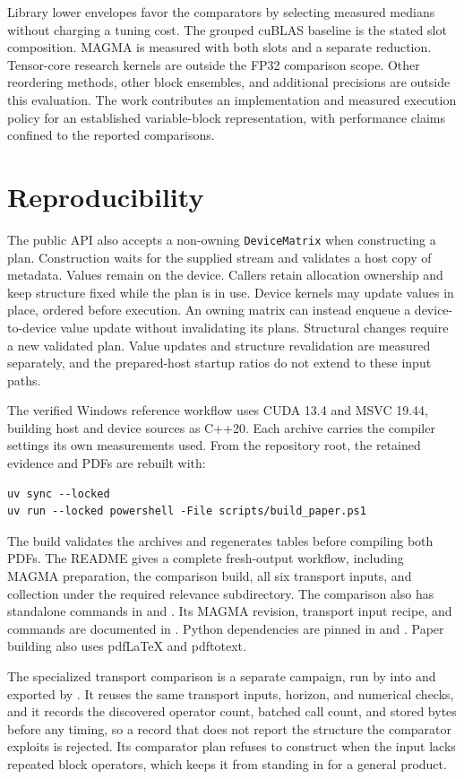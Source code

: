 \documentclass[10pt]{article}
\begin{document}
Library lower envelopes favor the comparators by selecting measured medians
without charging a tuning cost. The grouped cuBLAS baseline is the stated slot
composition. MAGMA is measured with both slots and a separate reduction.
Tensor-core research kernels are outside the FP32 comparison scope. Other reordering methods, other block
ensembles, and additional precisions are outside this evaluation. The work
contributes an implementation and measured execution policy for an established
variable-block representation, with performance claims confined to the
reported comparisons.

\section{Reproducibility}
The public API also accepts a non-owning \texttt{DeviceMatrix} when
constructing a plan. Construction waits for the supplied stream and
validates a host copy of metadata. Values remain on the device.
Callers retain allocation ownership and keep structure fixed while the
plan is in use. Device kernels may update values in place, ordered before
execution. An owning matrix can instead enqueue a device-to-device
value update without invalidating its plans. Structural changes require
a new validated plan. Value updates and structure revalidation are measured
separately, and the prepared-host startup ratios do not extend to these
input paths.

The verified Windows reference workflow uses CUDA 13.4 and MSVC 19.44,
building host and device sources as C++20. Each archive carries the compiler
settings its own measurements used.
From the repository root, the retained evidence and PDFs are rebuilt with:
\begin{verbatim}
uv sync --locked
uv run --locked powershell -File scripts/build_paper.ps1
\end{verbatim}
The build validates the archives and regenerates tables before compiling
both PDFs. The README gives a complete fresh-output workflow, including
MAGMA preparation, the comparison build, all six transport inputs, and collection
under the required relevance subdirectory. The comparison also has standalone
commands in  and .
Its MAGMA revision, transport input recipe, and commands are documented
in . Python dependencies are pinned in
 and . Paper building also uses
pdfLaTeX and pdftotext.

The specialized transport comparison is a separate campaign, run by
 into  and exported by
. It reuses the same transport inputs, horizon,
and numerical checks, and it records the discovered operator count, batched
call count, and stored bytes before any timing, so a record that does not
report the structure the comparator exploits is rejected. Its comparator
plan refuses to construct when the input lacks repeated block operators,
which keeps it from standing in for a general product.
\end{document}
